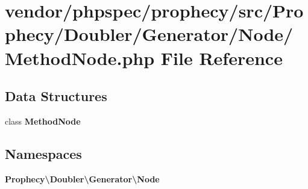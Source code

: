 \section{vendor/phpspec/prophecy/src/\+Prophecy/\+Doubler/\+Generator/\+Node/\+Method\+Node.php File Reference}
\label{_method_node_8php}
\subsection*{Data Structures}
\begin{DoxyCompactItemize}
\item 
class {\bf Method\+Node}
\end{DoxyCompactItemize}
\subsection*{Namespaces}
\begin{DoxyCompactItemize}
\item 
 {\bf Prophecy\textbackslash{}\+Doubler\textbackslash{}\+Generator\textbackslash{}\+Node}
\end{DoxyCompactItemize}
